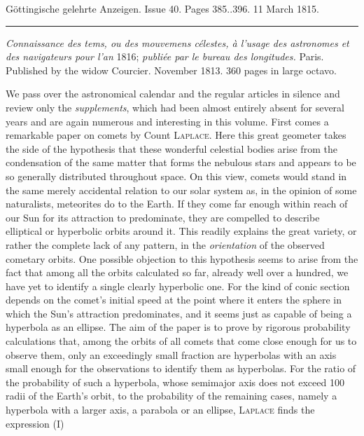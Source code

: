 \clearpage
{}

\hypertarget{native-586-lower}{}
\begin{center}\small Göttingische gelehrte Anzeigen. Issue 40. Pages 385..396. 11 March 1815.\\[3pt]\rule{.72\linewidth}{.3pt}\end{center}

\emph{Connaissance des tems, ou des mouvemens célestes, à l'usage des astronomes et des navigateurs pour
l'an} 1816; \emph{ publiée par le bureau des longitudes.} Paris. Published by the widow Courcier. November 1813. 360 pages in large octavo.

We pass over the astronomical calendar and the regular articles in silence and review only the \emph{supplements}, which had been almost entirely absent for several years and are again numerous and interesting in this volume. First comes a remarkable paper on comets by Count \textsc{Laplace}. Here this great geometer takes the side of the hypothesis that these wonderful celestial bodies arise from the condensation of the same matter that forms the nebulous stars and appears to be so generally distributed throughout space. On this view, comets would stand in the same merely accidental relation to our solar system as, in the opinion of some naturalists, meteorites do to the Earth. If they come far enough within reach of our Sun for its attraction to predominate, they are compelled to describe elliptical or hyperbolic orbits around it. This readily explains the great variety, or rather the complete lack of any pattern, in the \emph{orientation} of the observed cometary orbits. One possible objection to this hypothesis seems to arise from the fact that among all the orbits calculated so far, already well over a hundred, we have yet to identify a single clearly hyperbolic one. For the kind of conic section depends on the comet's initial speed at the point where it enters the sphere in which the Sun's attraction predominates, and it seems just as capable of being a hyperbola as an ellipse. The aim of the paper is to prove by rigorous probability calculations that, among the orbits of all comets that come close enough for us to observe them, only an exceedingly small fraction are hyperbolas with an axis small enough for the observations to identify them as hyperbolas. For the ratio of the probability of such a hyperbola, whose semimajor axis does not exceed 100 radii of the Earth's orbit, to the probability of the remaining cases, namely a hyperbola with a larger axis, a parabola or an ellipse, \textsc{Laplace} finds the expression (I)
